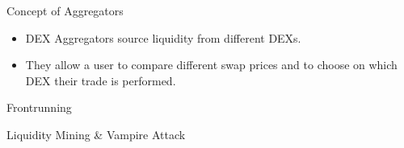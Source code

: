\documentclass[]{beamer}
\begin{document}
\begin{frame}{Concept of Aggregators}
\begin{figure}
	\centering
	\resizebox{0.8\textwidth}{!}{
	\begin{tikzpicture}[scale=1.0, every node/.style={scale=1.0}]
			
	\end{tikzpicture}}
\end{figure}
	
\begin{itemize}
	\item DEX Aggregators source liquidity from different DEXs.
	\item They allow a user to compare different swap prices and to choose on which DEX their trade is performed.
\end{itemize}

\end{frame}


\begin{frame}{Frontrunning}
\end{frame}


\begin{frame}{Liquidity Mining \& Vampire Attack}
	\begin{figure}[h!]
		\begin{center}
			
		\end{center}
	\end{figure}
\end{frame}
\end{document}
